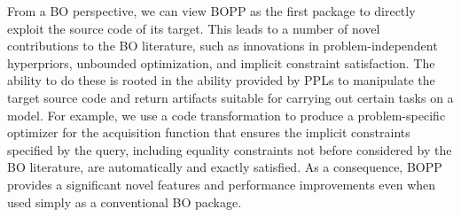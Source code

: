 From a BO perspective, we can view BOPP as the first package to directly exploit the source code of its target.
This leads to a number of novel contributions to the BO literature, such as innovations in 
problem-independent hyperpriors, unbounded optimization, and implicit constraint satisfaction.  
The ability to do these is rooted
in the ability provided by PPLs to manipulate the target source code and return artifacts suitable for carrying
out certain tasks on a model.  For example, we use a code transformation to produce a problem-specific
optimizer for the acquisition function that ensures the implicit constraints specified by the query,
including equality constraints not before considered by the BO literature, are automatically and exactly
satisfied.  As a consequence, BOPP provides a significant novel features and performance
improvements even when used simply as a conventional BO package.
